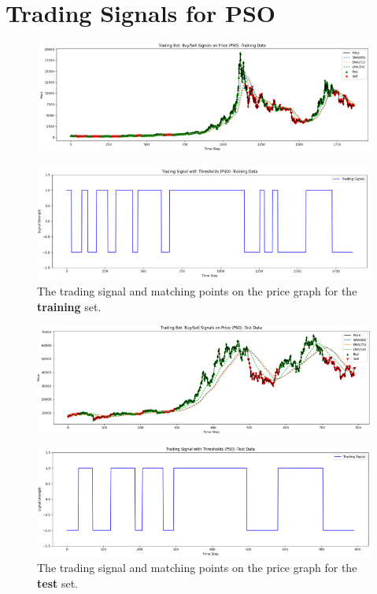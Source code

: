 \documentclass[a4paper, 12pt]{extarticle}
\begin{document}
\newpage
\appendix
\section{Trading Signals for PSO}
\begin{figure}[h!]
    \centering
    \includegraphics[width=\textwidth]{./assets/pso_train.png}
\end{figure}
\begin{figure}[h!]
    \centering
    \includegraphics[width=\textwidth]{./assets/pso_train_signal.png}
    \caption{The trading signal and matching points on the price graph for the \textbf{training} set.}
\end{figure}
\newpage
\begin{figure}[h!]
    \centering
    \includegraphics[width=\textwidth]{./assets/pso_test.png}
\end{figure}
\begin{figure}[h!]
    \centering
    \includegraphics[width=\textwidth]{./assets/pso_test_signal.png}
    \caption{The trading signal and matching points on the price graph for the \textbf{test} set.}
\end{figure}
\end{document}
